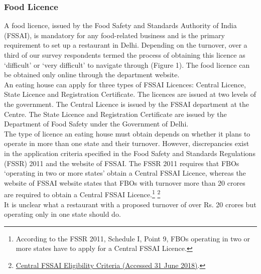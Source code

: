 \documentclass[a4paper, 12pt, twoside]{article}
\begin{document}
                    \subsubsection{Food Licence}
                    A food licence, issued by the Food Safety and Standards Authority of India (FSSAI), is mandatory for any food-related business and is the primary requirement to set up a restaurant in Delhi. Depending on the turnover, over a third of our survey 
respondents termed the process of obtaining this licence as ‘difficult’ or ‘very difficult’ to navigate through (Figure 1). The food licence can be obtained only online through the department website.\\
                    
                    An eating house can apply for three types of FSSAI Licences: Central Licence, State Licence and Registration Certificate. The licences are issued at two levels of the government. The Central Licence is issued by the FSSAI department at the Centre. 
The State Licence and Registration Certificate are issued by the Department of Food Safety under the Government of Delhi.\\
                    
                    The type of licence an eating house must obtain depends on whether it plans to operate in more than one state and their turnover. However, discrepancies exist in the application criteria specified in the Food Safety and Standards Regulations 
(FSSR) 2011 and the website of FSSAI. The FSSR 2011 requires that FBOs ‘operating in two or more states’ obtain a Central FSSAI Licence, whereas the website of FSSAI website states that FBOs with turnover more than 20 crores are required to obtain a 
Central FSSAI Licence.\footnote{According to the FSSR 2011, Schedule I, Point 9, FBOs operating in two or more states have to apply for a Central FSSAI Licence.} \footnote{\href{https://bit.ly/2pbFEXM}{Central FSSAI Eligibility Criteria (Accessed 31 June 
2018)}.} \\
                    
                    It is unclear what a restaurant with a proposed turnover of over Rs. 20 crores but operating only in one state should do. %
                
\end{document}
